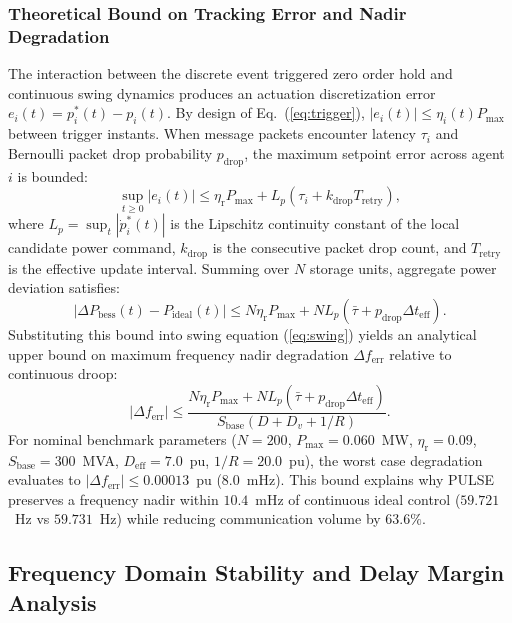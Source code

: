 \documentclass[preprint,12pt]{elsarticle}
\begin{document}
\subsubsection{Theoretical Bound on Tracking Error and Nadir Degradation}
\label{sec:theoretical_bound}
The interaction between the discrete event triggered zero order hold and continuous swing dynamics produces an actuation discretization error $e_i(t) = p_i^\ast(t) - p_i(t)$. By design of Eq.~(\ref{eq:trigger}), $|e_i(t)| \le \eta_i(t) P_{\max}$ between trigger instants. When message packets encounter latency $\tau_i$ and Bernoulli packet drop probability $p_{\mathrm{drop}}$, the maximum setpoint error across agent $i$ is bounded:
\begin{equation}
\sup_{t \ge 0} |e_i(t)| \le \eta_{\mathrm{r}} P_{\max} + L_p (\tau_i + k_{\mathrm{drop}} T_{\mathrm{retry}}),
\label{eq:error_bound}
\end{equation}
where $L_p = \sup_t |\dot{p}_i^\ast(t)|$ is the Lipschitz continuity constant of the local candidate power command, $k_{\mathrm{drop}}$ is the consecutive packet drop count, and $T_{\mathrm{retry}}$ is the effective update interval. Summing over $N$ storage units, aggregate power deviation satisfies:
\begin{equation}
|\Delta P_{\mathrm{bess}}(t) - P_{\mathrm{ideal}}(t)| \le N \eta_{\mathrm{r}} P_{\max} + N L_p (\bar{\tau} + p_{\mathrm{drop}} \Delta t_{\mathrm{eff}}).
\label{eq:fleet_bound}
\end{equation}
Substituting this bound into swing equation (\ref{eq:swing}) yields an analytical upper bound on maximum frequency nadir degradation $\Delta f_{\mathrm{err}}$ relative to continuous droop:
\begin{equation}
|\Delta f_{\mathrm{err}}| \le \frac{N \eta_{\mathrm{r}} P_{\max} + N L_p (\bar{\tau} + p_{\mathrm{drop}} \Delta t_{\mathrm{eff}})}{S_{\mathrm{base}} (D + D_v + 1/R)}.
\label{eq:nadir_bound}
\end{equation}
For nominal benchmark parameters ($N=200$, $P_{\max} = 0.060$~MW, $\eta_{\mathrm{r}} = 0.09$, $S_{\mathrm{base}} = 300$~MVA, $D_{\mathrm{eff}} = 7.0$~pu, $1/R = 20.0$~pu), the worst case degradation evaluates to $|\Delta f_{\mathrm{err}}| \le 0.00013$~pu ($8.0$~mHz). This bound explains why PULSE preserves a frequency nadir within $10.4$~mHz of continuous ideal control ($59.721$~Hz vs $59.731$~Hz) while reducing communication volume by $63.6\%$.

\subsection{Frequency Domain Stability and Delay Margin Analysis}
\label{sec:stability}
\end{document}

